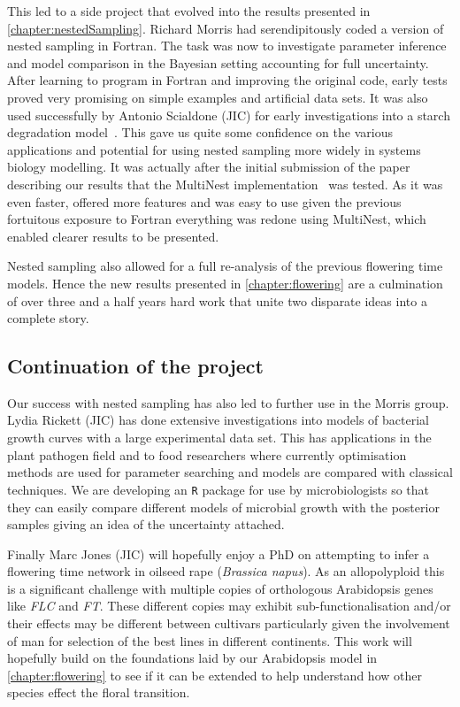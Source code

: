 This led to a side project that evolved into the results presented in \autoref{chapter:nestedSampling}.
Richard Morris had serendipitously coded a version of nested sampling in Fortran.
The task was now to investigate parameter inference and model comparison in the Bayesian setting accounting for full uncertainty.
After learning to program in Fortran and improving the original code, early tests proved very promising on simple examples and artificial data sets.
It was also used successfully by Antonio Scialdone (JIC) for early investigations into a starch degradation model~\cite{scialdone2013}.
This gave us quite some confidence on the various applications and potential for using nested sampling more widely in systems biology modelling.
It was actually after the initial submission of the paper describing our results that the MultiNest implementation~\cite{feroz2009multinest} was tested.
As it was even faster, offered more features and was easy to use given the previous fortuitous exposure to Fortran everything was redone using MultiNest, which enabled clearer results to be presented.

Nested sampling also allowed for a full re-analysis of the previous flowering time models.
Hence the new results presented in \autoref{chapter:flowering} are a culmination of over three and a half years hard work that unite two disparate ideas into a complete story.

\subsection{Continuation of the project}

Our success with nested sampling has also led to further use in the Morris group.
Lydia Rickett (JIC) has done extensive investigations into models of bacterial growth curves with a large experimental data set.
This has applications in the plant pathogen field and to food researchers where currently optimisation methods are used for parameter searching and models are compared with classical techniques.
We are developing an \texttt{R} package for use by microbiologists so that they can easily compare different models of microbial growth with the posterior samples giving an idea of the uncertainty attached.

Finally Marc Jones (JIC) will hopefully enjoy a PhD on attempting to infer a flowering time network in oilseed rape (\emph{Brassica napus}).
As an allopolyploid this is a significant challenge with multiple copies of orthologous Arabidopsis genes like \emph{FLC} and \emph{FT}.
These different copies may exhibit sub-functionalisation and/or their effects may be different between cultivars particularly given the involvement of man for selection of the best lines in different continents.
This work will hopefully build on the foundations laid by our Arabidopsis model in \autoref{chapter:flowering} to see if it can be extended to help understand how other species effect the floral transition.